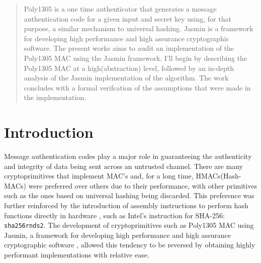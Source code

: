 \documentclass[twocolumn]{article}
\begin{document}

\begin{abstract}
    Poly1305 is a one time authenticator that generates a message authentication code for a given input and secret key using, for that purpose, a similar mechanism to
    universal hashing. Jasmin is a framework for developing high performance and high assurance cryptographic software. The present works aims to audit an implementation 
    of the Poly1305 MAC using the Jasmin framework. I'll begin by describing the Poly1305 MAC at a high(abstraction) level, followed by an in-depth analysis of the Jasmin 
    implementation of the algorithm. The work concludes with a formal verifcation of the assumptions that were made in the implementation.
\end{abstract}

\section{Introduction}
Message authentication codes play a major role in guaranteeing the authenticity and integrity of data being sent across an untrusted channel. There are many 
cryptoprimitives that implement MAC's and, for a long time, HMACs(Hash-MACs) were preferred over others due to their performance, with other primitives such 
as the ones based on universal hashing being discarded. This preference was further reinforced by the introduction of assembly instructions to perform hash 
functions directly in hardware \cite{sha_extensions}, such as Intel's instruction for SHA-256: \texttt{sha256rnds2}. The development of cryptoprimitives 
such as Poly1305 MAC using Jasmin, a framework for developing high performance and high assurance cryptographic software \cite{jasmin_paper}, allowed this tendency 
to be reversed by obtaining highly performant implementations with relative ease.
\end{document}
